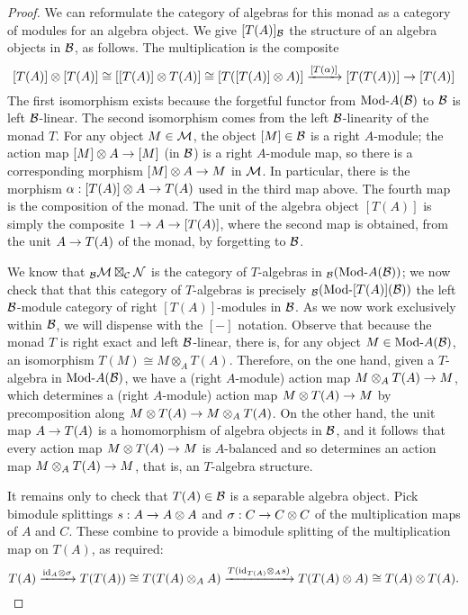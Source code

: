 \documentclass{amsart}
\begin{document}
\begin{proof}
We can reformulate the category of algebras for this monad as a category of modules for an algebra object.  We give $[T(A)]_\mathcal B$ the structure of an algebra objects in $\mathcal B$, as follows.  The multiplication is the composite
\[
[T(A)] \otimes [T(A)] \cong [[T(A)] \otimes T(A)] \cong [T([T(A)] \otimes A)] \xrightarrow{[T(\alpha)]} [T(T(A))] \rightarrow [T(A)]
\]
The first isomorphism exists because the forgetful functor from $\Mod{}{A}(\cB)$ to $\mathcal B$ is left $\mathcal B$-linear.  The second isomorphism comes from the left $\mathcal B$-linearity of the monad $T$.  For any object $M \in \mathcal M$, the object $[M] \in \mathcal B$ is a right $A$-module; the action map $[M] \otimes A \rightarrow [M]$ (in $\mathcal B$) is a right $A$-module map, so there is a corresponding morphism $[M] \otimes A \rightarrow M$ in $\mathcal M$.  In particular, there is the morphism $\alpha: [T(A)] \otimes A \rightarrow T(A)$ used in the third map above.  The fourth map is the composition of the monad.  The unit of the algebra object $[T(A)]$ is simply the composite $1 \rightarrow A \rightarrow [T(A)]$, where the second map is obtained, from the unit $A \rightarrow T(A)$ of the monad, by forgetting to $\mathcal B$.

We know that ${}_\mathcal B \mathcal M \boxtimes_\mathcal C \mathcal N$ is the category of $T$-algebras in ${}_\cB (\Mod{}{A}(\cB))$; we now check that that this category of $T$-algebras is precisely ${}_\cB (\Mod{}{[T(A)]}(\cB))$ the left $\mathcal B$-module category of right $[T(A)]$-modules in $\mathcal B$.  As we now work exclusively within $\mathcal B$, we will dispense with the $[-]$ notation.  Observe that because the monad $T$ is right exact and left $\mathcal B$-linear, there is, for any object $M \in \Mod{}{A}(\cB)$, an isomorphism $T(M) \cong M \otimes_A T(A)$.  Therefore, on the one hand, given a $T$-algebra in $\Mod{}{A}(\cB)$, we have a (right $A$-module) action map $M \otimes_A T(A) \rightarrow M$, which determines a (right $A$-module) action map $M \otimes T(A) \rightarrow M$ by precomposition along $M \otimes T(A) \rightarrow M \otimes_A T(A)$.  On the other hand, the unit map $A \rightarrow T(A)$ is a homomorphism of algebra objects in $\mathcal B$, and it follows that every action map $M \otimes T(A) \rightarrow M$ is $A$-balanced and so determines an action map $M \otimes_A T(A) \rightarrow M$, that is, an $T$-algebra structure.

It remains only to check that $T(A) \in \mathcal B$ is a separable algebra object.  Pick bimodule splittings $s: A \rightarrow A \otimes A$ and $\sigma: C \rightarrow C \otimes C$ of the multiplication maps of $A$ and $C$.  These combine to provide a bimodule splitting of the multiplication map on $T(A)$, as required:
\[
T(A) \xrightarrow{\mathrm{id}_A \otimes \sigma} T(T(A)) \cong T(T(A) \otimes_A A) \xrightarrow{T(\mathrm{id}_{T(A)} \otimes_A s)} T(T(A) \otimes A) \cong T(A) \otimes T(A). \qedhere
\]

\end{proof} %
\end{document}
